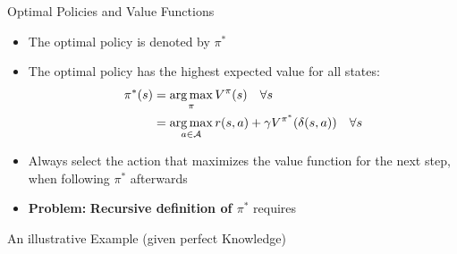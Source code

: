 \begin{frame}{Optimal Policies and Value Functions}{}
	\begin{itemize}
		\item The optimal policy is denoted by $\pi^*$
		\item The optimal policy has the highest expected value for all states:
		\begin{align*}
			\pi^*(s) &= \operatorname*{arg\,max}_{\pi} V^{\pi}(s) \quad \forall s \\
					&= \operatorname*{arg\,max}_{a \in \mathcal{A}} r(s, a) + \gamma V^{\pi^*}(\delta(s, a)) \quad \forall s
		\end{align*}
		\item Always select the action that maximizes the value function for the next step,
			when following $\pi^*$ afterwards
		\item \textbf{Problem:} \textbf{Recursive definition of $\pi^*$} requires 
	\end{itemize}
\end{frame}


\begin{frame}{An illustrative Example (given perfect Knowledge)}{}
\end{frame}


